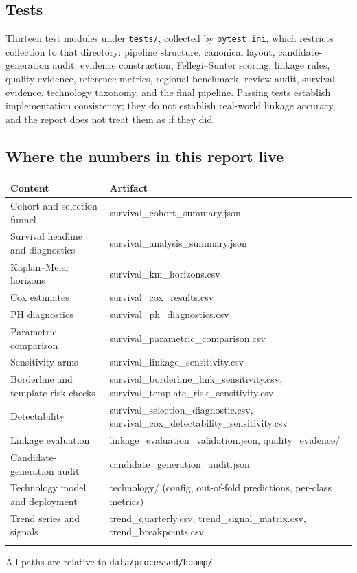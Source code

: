 \subsection*{Tests}

Thirteen test modules under \texttt{tests/}, collected by \texttt{pytest.ini}, which restricts collection to
that directory: pipeline structure, canonical layout, candidate-generation audit, evidence construction,
Fellegi--Sunter scoring, linkage rules, quality evidence, reference metrics, regional benchmark, review audit,
survival evidence, technology taxonomy, and the final pipeline. Passing tests establish implementation
consistency; they do not establish real-world linkage accuracy, and the report does not treat them as if they
did.

\subsection*{Where the numbers in this report live}

\begin{longtable}[]{@{}>{\raggedright\arraybackslash}p{5.6cm}>{\raggedright\arraybackslash}p{8.4cm}@{}}
\toprule\noalign{}
Content & Artifact \\
\midrule\noalign{}
\endhead
Cohort and selection funnel & survival\_cohort\_summary.json \\
Survival headline and diagnostics & survival\_analysis\_summary.json \\
Kaplan--Meier horizons & survival\_km\_horizons.csv \\
Cox estimates & survival\_cox\_results.csv \\
PH diagnostics & survival\_ph\_diagnostics.csv \\
Parametric comparison & survival\_parametric\_comparison.csv \\
Sensitivity arms & survival\_linkage\_sensitivity.csv \\
Borderline and template-risk checks & survival\_borderline\_link\_sensitivity.csv, survival\_template\_risk\_sensitivity.csv \\
Detectability & survival\_selection\_diagnostic.csv, survival\_cox\_detectability\_sensitivity.csv \\
Linkage evaluation & linkage\_evaluation\_validation.json, quality\_evidence/ \\
Candidate-generation audit & candidate\_generation\_audit.json \\
Technology model and deployment & technology/ (config, out-of-fold predictions, per-class metrics) \\
Trend series and signals & trend\_quarterly.csv, trend\_signal\_matrix.csv, trend\_breakpoints.csv \\
\bottomrule\noalign{}
\end{longtable}

All paths are relative to \texttt{data/processed/boamp/}.
